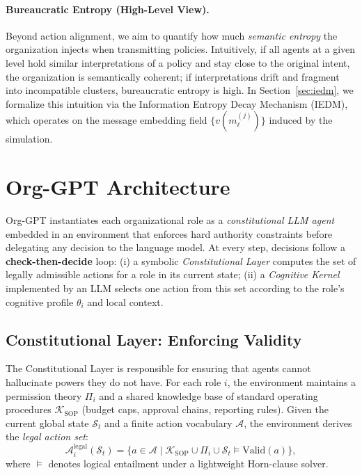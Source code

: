 \documentclass{article}
\begin{document}
\paragraph{Bureaucratic Entropy (High-Level View).}
Beyond action alignment, we aim to quantify how much \emph{semantic entropy} the organization injects when transmitting policies.
Intuitively, if all agents at a given level hold similar interpretations of a policy and stay close to the original intent, the organization is semantically coherent; if interpretations drift and fragment into incompatible clusters, bureaucratic entropy is high.
In Section~\ref{sec:iedm}, we formalize this intuition via the Information Entropy Decay Mechanism (IEDM), which operates on the message embedding field $\{v(m_{\ell}^{(j)})\}$ induced by the simulation.
\section{Org-GPT Architecture}
\label{sec:architecture}

Org-GPT instantiates each organizational role as a \emph{constitutional LLM agent} embedded in an environment that enforces hard authority constraints before delegating any decision to the language model.
At every step, decisions follow a \textbf{check-then-decide} loop:
(i) a symbolic \emph{Constitutional Layer} computes the set of legally admissible actions for a role in its current state;
(ii) a \emph{Cognitive Kernel} implemented by an LLM selects one action from this set according to the role’s cognitive profile $\theta_i$ and local context.

\subsection{Constitutional Layer: Enforcing Validity}
\label{sec:constitution}

The Constitutional Layer is responsible for ensuring that agents cannot hallucinate powers they do not have.
For each role $i$, the environment maintains a permission theory $\Pi_i$ and a shared knowledge base of standard operating procedures $\mathcal{K}_{\text{SOP}}$ (budget caps, approval chains, reporting rules).
Given the current global state $\mathcal{S}_t$ and a finite action vocabulary $\mathcal{A}$, the environment derives the \emph{legal action set}:
\begin{equation}
    \mathcal{A}^{\text{legal}}_i(\mathcal{S}_t)
    =
    \big\{ a \in \mathcal{A} \;\big|\;
    \mathcal{K}_{\text{SOP}} \cup \Pi_i \cup \mathcal{S}_t \models \mathrm{Valid}(a)
    \big\},
    \label{eq:legal-actions}
\end{equation}
where $\models$ denotes logical entailment under a lightweight Horn-clause solver.
\end{document}
